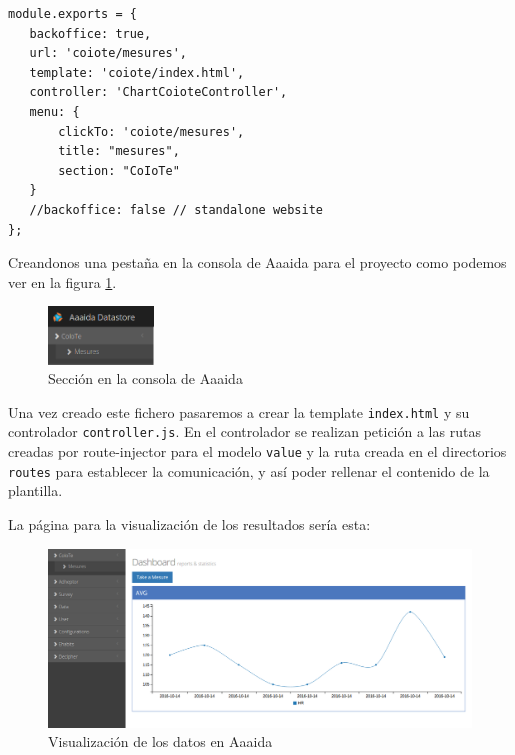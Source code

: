 \begin{verbatim}
module.exports = {
   backoffice: true,
   url: 'coiote/mesures',
   template: 'coiote/index.html',
   controller: 'ChartCoioteController',
   menu: {
       clickTo: 'coiote/mesures',
       title: "mesures",
       section: "CoIoTe"
   }
   //backoffice: false // standalone website
};
\end{verbatim}

Creandonos una pestaña en la consola de Aaaida para el proyecto como podemos ver en la figura \ref{sec:coioteSec}. 

\begin{figure}[htb]
\begin{center}
\includegraphics[width=0.25\textwidth]{./setup/arquitecturaCoiote}
\caption{Sección en la consola de Aaaida}
\label{sec:coioteSec}
\end{center}
\end{figure}

Una vez creado este fichero pasaremos a crear la template \texttt{index.html} y su controlador \texttt{controller.js}. En el controlador se realizan petición a las rutas creadas por route-injector para el modelo \texttt{value} y la ruta creada en el directorios \texttt{routes} para establecer la comunicación, y así poder rellenar el contenido de la plantilla.

La página para la visualización de los resultados sería esta:

\begin{figure}[htb]
\begin{center}
\includegraphics[width=1\textwidth]{./setup/visualizacionPaginaCoiote}
\caption{Visualización de los datos en Aaaida}
\end{center}
\end{figure}
\pagebreak

